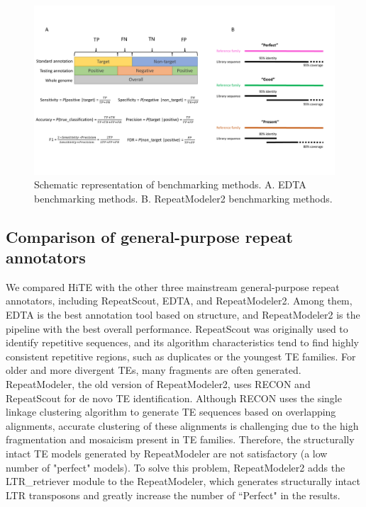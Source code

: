 \documentclass{bmcart}
\begin{document}
\begin{figure}[h!]
	\centerline{\includegraphics[width=1.0\textwidth]{figures/EvaluationMethods.pdf}}
	\caption{Schematic representation of benchmarking methods. A. EDTA benchmarking methods. B. RepeatModeler2 benchmarking methods.}
	\label{fig:benchmarking_methods}
\end{figure}


\subsection*{Comparison of general-purpose repeat annotators}
We compared HiTE with the other three mainstream general-purpose repeat annotators, including RepeatScout, EDTA, and RepeatModeler2. Among them, EDTA is the best annotation tool based on structure, and RepeatModeler2 is the pipeline with the best overall performance. RepeatScout was originally used to identify repetitive sequences, and its algorithm characteristics tend to find highly consistent repetitive regions, such as duplicates or the youngest TE families. For older and more divergent TEs, many fragments are often generated. RepeatModeler, the old version of RepeatModeler2, uses RECON and RepeatScout for de novo TE identification. Although RECON uses the single linkage clustering algorithm to generate TE sequences based on overlapping alignments, accurate clustering of these alignments is challenging due to the high fragmentation and mosaicism present in TE families\cite{storer2022methodologies}. Therefore, the structurally intact TE models generated by RepeatModeler are not satisfactory (a low number of "perfect" models). To solve this problem, RepeatModeler2 adds the LTR\_retriever module to the RepeatModeler, which generates structurally intact LTR transposons and greatly increase the number of ``Perfect" in the results\cite{flynn2020repeatmodeler2}.
\end{document}
